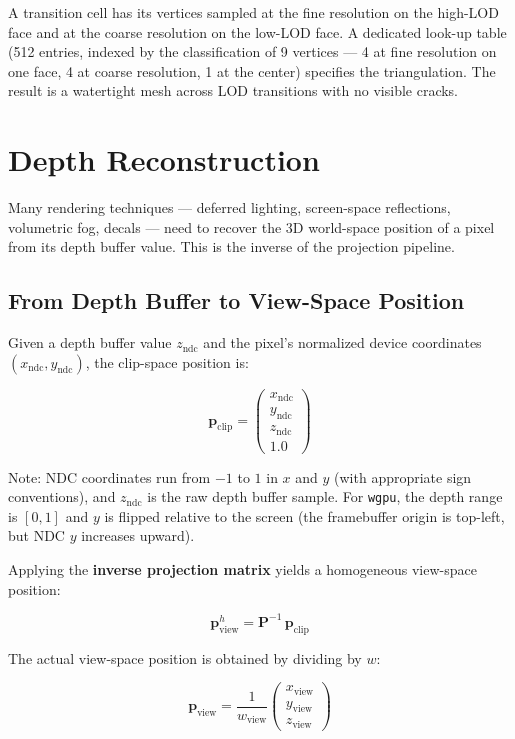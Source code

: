 \documentclass[
  11pt,
  letterpaper,
  DIV=11,
  numbers=noendperiod,
  twoside,
  open=right]{scrreprt}
\begin{document}
A transition cell has its vertices sampled at the fine resolution on the
high-LOD face and at the coarse resolution on the low-LOD face. A
dedicated look-up table (512 entries, indexed by the classification of 9
vertices --- 4 at fine resolution on one face, 4 at coarse resolution, 1
at the center) specifies the triangulation. The result is a watertight
mesh across LOD transitions with no visible cracks.

\section{Depth Reconstruction}\label{depth-reconstruction}

Many rendering techniques --- deferred lighting, screen-space
reflections, volumetric fog, decals --- need to recover the 3D
world-space position of a pixel from its depth buffer value. This is the
inverse of the projection pipeline.

\subsection{From Depth Buffer to View-Space
Position}\label{from-depth-buffer-to-view-space-position}

Given a depth buffer value \(z_{\text{ndc}}\) and the pixel's normalized
device coordinates \((x_{\text{ndc}}, y_{\text{ndc}})\), the clip-space
position is:

\[
\mathbf{p}_{\text{clip}} = \begin{pmatrix} x_{\text{ndc}} \\ y_{\text{ndc}} \\ z_{\text{ndc}} \\ 1.0 \end{pmatrix}
\]

Note: NDC coordinates run from \(-1\) to \(1\) in \(x\) and \(y\) (with
appropriate sign conventions), and \(z_{\text{ndc}}\) is the raw depth
buffer sample. For \texttt{wgpu}, the depth range is \([0, 1]\) and
\(y\) is flipped relative to the screen (the framebuffer origin is
top-left, but NDC \(y\) increases upward).

Applying the \textbf{inverse projection matrix} yields a homogeneous
view-space position:

\[
\mathbf{p}_{\text{view}}^{h} = \mathbf{P}^{-1} \, \mathbf{p}_{\text{clip}}
\]

The actual view-space position is obtained by dividing by \(w\):

\[
\mathbf{p}_{\text{view}} = \frac{1}{w_{\text{view}}} \begin{pmatrix} x_{\text{view}} \\ y_{\text{view}} \\ z_{\text{view}} \end{pmatrix}
\]
\end{document}
